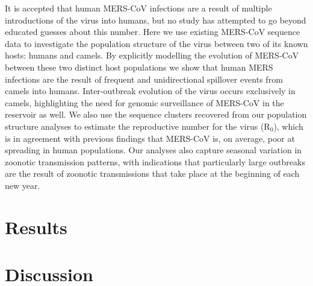 \documentclass[11pt,oneside,letterpaper]{article}
\begin{document}
It is accepted that human MERS-CoV infections are a result of multiple introductions of the virus into humans, but no study has attempted to go beyond educated guesses about this number.
Here we use existing MERS-CoV sequence data to investigate the population structure of the virus between two of its known hosts: humans and camels.
By explicitly modelling the evolution of MERS-CoV between these two distinct host populations we show that human MERS infections are the result of frequent and unidirectional spillover events from camels into humans.
Inter-outbreak evolution of the virus occurs exclusively in camels, highlighting the need for genomic surveillance of MERS-CoV in the reservoir as well.
We also use the sequence clusters recovered from our population structure analyses to estimate the reproductive number for the virus (R$_{0}$), which is in agreement with previous findings that MERS-CoV is, on average, poor at spreading in human populations.
Our analyses also capture seasonal variation in zoonotic transmission patterns, with indications that particularly large outbreaks are the result of zoonotic transmissions that take place at the beginning of each new year.



%	

\section*{Results}

\subsection*{}


\section*{Discussion}
\end{document}
